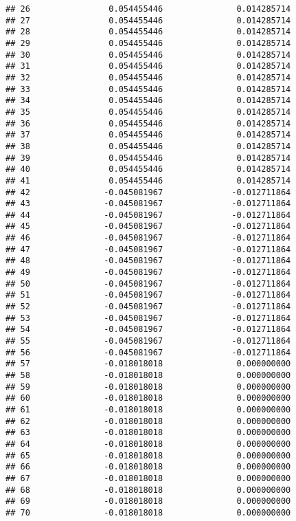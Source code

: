 \documentclass[]{article}
\begin{document}
\begin{verbatim}
## 26                0.054455446               0.014285714
## 27                0.054455446               0.014285714
## 28                0.054455446               0.014285714
## 29                0.054455446               0.014285714
## 30                0.054455446               0.014285714
## 31                0.054455446               0.014285714
## 32                0.054455446               0.014285714
## 33                0.054455446               0.014285714
## 34                0.054455446               0.014285714
## 35                0.054455446               0.014285714
## 36                0.054455446               0.014285714
## 37                0.054455446               0.014285714
## 38                0.054455446               0.014285714
## 39                0.054455446               0.014285714
## 40                0.054455446               0.014285714
## 41                0.054455446               0.014285714
## 42               -0.045081967              -0.012711864
## 43               -0.045081967              -0.012711864
## 44               -0.045081967              -0.012711864
## 45               -0.045081967              -0.012711864
## 46               -0.045081967              -0.012711864
## 47               -0.045081967              -0.012711864
## 48               -0.045081967              -0.012711864
## 49               -0.045081967              -0.012711864
## 50               -0.045081967              -0.012711864
## 51               -0.045081967              -0.012711864
## 52               -0.045081967              -0.012711864
## 53               -0.045081967              -0.012711864
## 54               -0.045081967              -0.012711864
## 55               -0.045081967              -0.012711864
## 56               -0.045081967              -0.012711864
## 57               -0.018018018               0.000000000
## 58               -0.018018018               0.000000000
## 59               -0.018018018               0.000000000
## 60               -0.018018018               0.000000000
## 61               -0.018018018               0.000000000
## 62               -0.018018018               0.000000000
## 63               -0.018018018               0.000000000
## 64               -0.018018018               0.000000000
## 65               -0.018018018               0.000000000
## 66               -0.018018018               0.000000000
## 67               -0.018018018               0.000000000
## 68               -0.018018018               0.000000000
## 69               -0.018018018               0.000000000
## 70               -0.018018018               0.000000000

\end{verbatim}
\end{document}
